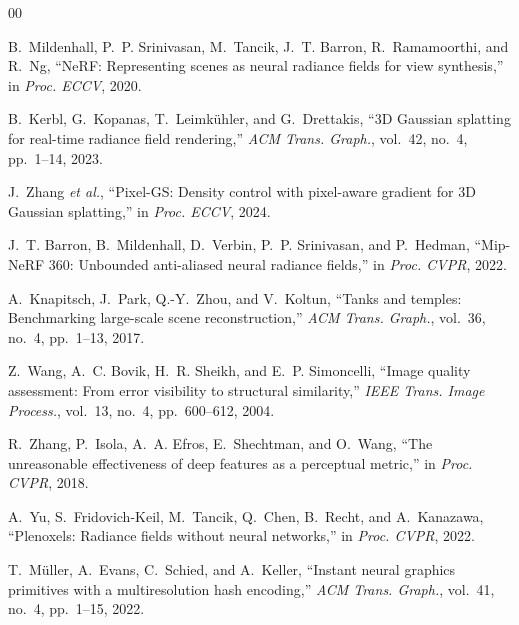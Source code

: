 \documentclass[conference]{IEEEtran}
\begin{document}
\begin{thebibliography}{00}

B.~Mildenhall, P.~P. Srinivasan, M.~Tancik, J.~T. Barron, R.~Ramamoorthi, and R.~Ng,
``NeRF: Representing scenes as neural radiance fields for view synthesis,''
in \emph{Proc. ECCV}, 2020.

B.~Kerbl, G.~Kopanas, T.~Leimkühler, and G.~Drettakis,
``3D Gaussian splatting for real-time radiance field rendering,''
\emph{ACM Trans. Graph.}, vol.~42, no.~4, pp.~1--14, 2023.

J.~Zhang \emph{et al.},
``Pixel-GS: Density control with pixel-aware gradient for 3D Gaussian splatting,''
in \emph{Proc. ECCV}, 2024.

J.~T. Barron, B.~Mildenhall, D.~Verbin, P.~P. Srinivasan, and P.~Hedman,
``Mip-NeRF 360: Unbounded anti-aliased neural radiance fields,''
in \emph{Proc. CVPR}, 2022.

A.~Knapitsch, J.~Park, Q.-Y.~Zhou, and V.~Koltun,
``Tanks and temples: Benchmarking large-scale scene reconstruction,''
\emph{ACM Trans. Graph.}, vol.~36, no.~4, pp.~1--13, 2017.

Z.~Wang, A.~C. Bovik, H.~R. Sheikh, and E.~P. Simoncelli,
``Image quality assessment: From error visibility to structural similarity,''
\emph{IEEE Trans. Image Process.}, vol.~13, no.~4, pp.~600--612, 2004.

R.~Zhang, P.~Isola, A.~A. Efros, E.~Shechtman, and O.~Wang,
``The unreasonable effectiveness of deep features as a perceptual metric,''
in \emph{Proc. CVPR}, 2018.

A.~Yu, S.~Fridovich-Keil, M.~Tancik, Q.~Chen, B.~Recht, and A.~Kanazawa,
``Plenoxels: Radiance fields without neural networks,''
in \emph{Proc. CVPR}, 2022.

T.~Müller, A.~Evans, C.~Schied, and A.~Keller,
``Instant neural graphics primitives with a multiresolution hash encoding,''
\emph{ACM Trans. Graph.}, vol.~41, no.~4, pp.~1--15, 2022.

\end{thebibliography}
\end{document}

